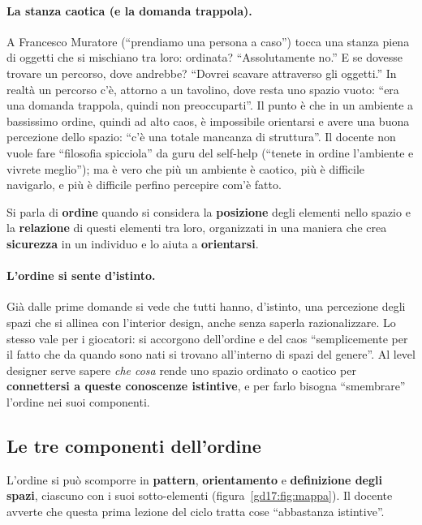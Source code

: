 \paragraph{La stanza caotica (e la domanda trappola).} A Francesco Muratore (``prendiamo
una persona a caso'') tocca una stanza piena di oggetti che si mischiano tra loro:
ordinata? ``Assolutamente no.'' E se dovesse trovare un percorso, dove andrebbe?
``Dovrei scavare attraverso gli oggetti.'' In realtà un percorso c'è, attorno a un
tavolino, dove resta uno spazio vuoto: ``era una domanda trappola, quindi non
preoccuparti''. Il punto è che in un ambiente a bassissimo ordine, quindi ad alto
caos, è impossibile orientarsi e avere una buona percezione dello spazio: ``c'è una
totale mancanza di struttura''. Il docente non vuole fare ``filosofia spicciola'' da
guru del self-help (``tenete in ordine l'ambiente e vivrete meglio''); ma è vero che
più un ambiente è caotico, più è difficile navigarlo, e più è difficile perfino
percepire com'è fatto.

\begin{definition}[Ordine]
Si parla di \textbf{ordine} quando si considera la \textbf{posizione} degli elementi
nello spazio e la \textbf{relazione} di questi elementi tra loro, organizzati in una
maniera che crea \textbf{sicurezza} in un individuo e lo aiuta a
\textbf{orientarsi}.
\end{definition}

\paragraph{L'ordine si sente d'istinto.} Già dalle prime domande si vede che tutti
hanno, d'istinto, una percezione degli spazi che si allinea con l'interior design, anche
senza saperla razionalizzare. Lo stesso vale per i giocatori: si accorgono dell'ordine
e del caos ``semplicemente per il fatto che da quando sono nati si trovano all'interno
di spazi del genere''. Al level designer serve sapere \emph{che cosa} rende uno spazio
ordinato o caotico per \textbf{connettersi a queste conoscenze istintive}, e per farlo
bisogna ``smembrare'' l'ordine nei suoi componenti.

\subsection{Le tre componenti dell'ordine}

L'ordine si può scomporre in \textbf{pattern}, \textbf{orientamento} e
\textbf{definizione degli spazi}, ciascuno con i suoi sotto-elementi
(figura~\ref{gd17:fig:mappa}). Il docente avverte che questa prima lezione del ciclo
tratta cose ``abbastanza istintive''.

